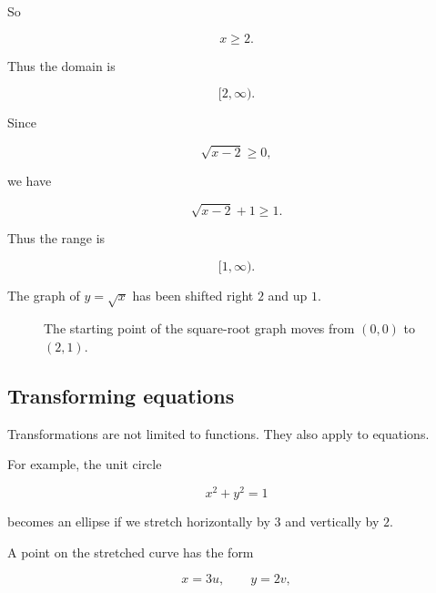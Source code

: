 So

\[
x\ge2.
\]

Thus the domain is

\[
\boxed{[2,\infty)}.
\]

Since

\[
\sqrt{x-2}\ge0,
\]

we have

\[
\sqrt{x-2}+1\ge1.
\]

Thus the range is

\[
\boxed{[1,\infty)}.
\]

The graph of \(y=\sqrt{x}\) has been shifted right \(2\) and up \(1\).

\begin{figure}[h]
\centering
{}
\caption{The starting point of the square-root graph moves from \((0,0)\) to \((2,1)\).}
\label{fig:appendix-sqrt-shift}
\end{figure}

\subsection{Transforming equations}
\label{appsubsec:transforming-equations}

Transformations are not limited to functions.  They also apply to equations.

For example, the unit circle

\[
x^2+y^2=1
\]

becomes an ellipse if we stretch horizontally by \(3\) and vertically by \(2\).

A point on the stretched curve has the form

\[
x=3u,
\qquad
y=2v,
\]

